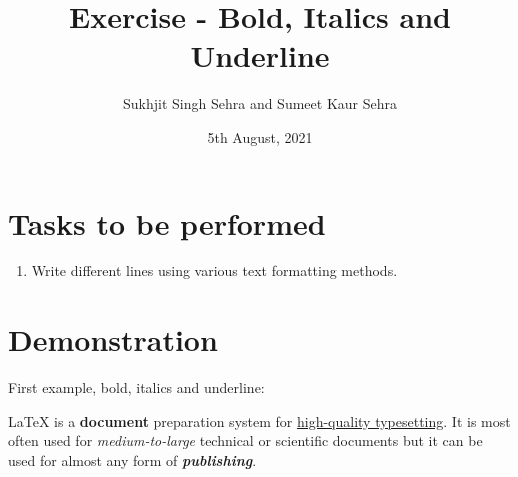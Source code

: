 \documentclass{article}
\title{Exercise  - Bold, Italics and Underline}
\author{Sukhjit Singh Sehra and Sumeet Kaur Sehra}
\date{5th August, 2021}
\begin{document}
	\maketitle

	\section*{Tasks to be performed}
	\begin{enumerate}
		\item  Write different lines using various text formatting methods. 
	\end{enumerate}
	
\section*{Demonstration}

First example, bold, italics and underline:

LaTeX is a \textbf{document} preparation system for \underline{high-quality typesetting}. It is most often used for \textit{medium-to-large} technical or scientific documents but it can be used for almost any form of \textbf{\textit{publishing}}.
\end{document}
